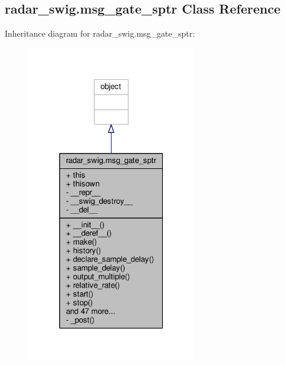 \subsection{radar\+\_\+swig.\+msg\+\_\+gate\+\_\+sptr Class Reference}
\label{classradar__swig_1_1msg__gate__sptr}


Inheritance diagram for radar\+\_\+swig.\+msg\+\_\+gate\+\_\+sptr\+:
\nopagebreak
\begin{figure}[H]
\begin{center}
\leavevmode
\includegraphics[width=211pt]{df/d20/classradar__swig_1_1msg__gate__sptr__inherit__graph}
\end{center}
\end{figure}


